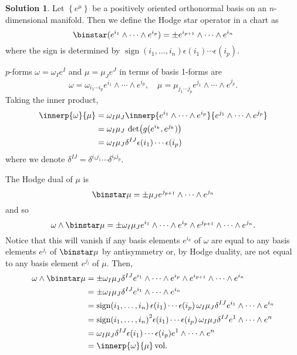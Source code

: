 \documentclass[11pt, a4paper]{report}
\theoremstyle{definition}
\newtheorem{solution}{Solution}[part]
\newenvironment{sol}{\begin{solution}}{\end{solution}\pagebreak[3]}
\newcommand*{\op}[1]{\ensuremath\mathop{}\mathopen{}#1}
\renewcommand*{\star}{\op{\binstar}\mathord{}}
\DeclareMathOperator{\sign}{sign}
\begin{document}
\begin{sol}

Let $\left\{e^\mu\right\}$ be a positively oriented orthonormal basis on an $n$-dimensional manifold. Then we define the Hodge star operator in a chart as
\[
    \star (e^{i_1} \wedge \cdots \wedge e^{i_p}) = \pm e^{i_{p + 1}} \wedge \cdots \wedge e^{i_n}
\]
where the sign is determined by $\sign(i_1, \ldots, i_n) \epsilon(i_1) \cdots \epsilon(i_p)$.

$p$-forms $\omega = \omega_I e^I$ and $\mu = \mu_J e^J$ in terms of basis 1-forms are
\[
    \omega = \omega_{i_1 \cdots i_p} e^{i_1} \wedge \cdots \wedge e^{i_p}, \quad
    \mu = \mu_{j_1 \cdots j_p} e^{j_1} \wedge \cdots \wedge e^{j_p}.
\]
Taking the inner product,
\begin{align*}
    \innerp{\omega}{\mu} &= \omega_I \mu_J \innerp{e^{i_1} \wedge \cdots \wedge e^{i_p}}{e^{j_1} \wedge \cdots \wedge e^{j_p}} \\
        &= \omega_I \mu_J \, \det \bigl(g(e^{i_k}, e^{j_k})\bigr) \\
        &= \omega_I \mu_J \delta^{IJ} \epsilon(i_1) \cdots \epsilon(i_p)
\end{align*}
where we denote $\delta^{IJ} = \delta^{i_1 j_1} \cdots \delta^{i_p j_p}$.

The Hodge dual of $\mu$ is
\[
    \star \mu = \pm \mu_J e^{j_{p + 1}} \wedge \cdots \wedge e^{j_n}
\]
and so
\[
    \omega \wedge \star \mu = \pm \omega_I \mu_J e^{i_1} \wedge \cdots \wedge e^{i_p} \wedge e^{j_{p + 1}} \wedge \cdots \wedge e^{j_n}.
\]
Notice that this will vanish if any basis elements $e^{i_k}$ of $\omega$ are equal to any basis elements $e^{j_l}$ of $\star \mu$ by antisymmetry or, by Hodge duality, are not equal to any basis element $e^{j_l}$ of $\mu$.
Then,
\begin{align*}
    \omega \wedge \star \mu &= \pm \omega_I \mu_J \delta^{IJ} e^{i_1} \wedge \cdots \wedge e^{i_p} \wedge e^{i_{p + 1}} \wedge \cdots \wedge e^{i_n} \\
        &= \pm \omega_I \mu_J \delta^{IJ} e^{i_1} \wedge \cdots \wedge e^{i_n} \\
        &= \sign(i_1, \ldots, i_n) \, \epsilon(i_1) \cdots \epsilon(i_p) \, \omega_I \mu_J \delta^{IJ} e^{i_1} \wedge \cdots \wedge e^{i_n} \\
        &= {\sign(i_1, \ldots, i_n)}^2 \epsilon(i_1) \cdots \epsilon(i_p) \, \omega_I \mu_J \delta^{IJ} e^1 \wedge \cdots \wedge e^n \\
        &= \omega_I \mu_J \delta^{IJ} \epsilon(i_1) \cdots \epsilon(i_p) e^1 \wedge \cdots \wedge e^n \\
        &= \innerp{\omega}{\mu} \, \text{vol}.
\end{align*}

\end{sol}
\end{document}
